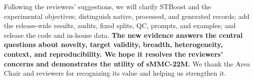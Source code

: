 \documentclass[10pt]{article}
\begin{document}
Following the reviewers' suggestions, we will clarify STBoost and the
experimental objectives; distinguish native, processed, and generated
records; add the release-wide results, audits, fixed splits, QC, prompts, and
examples; and release the code and in-house data. \textbf{The new evidence
answers the central questions about novelty, target validity, breadth,
heterogeneity, context, and reproducibility. We hope it resolves the reviewers'
concerns and demonstrates the utility of sMMC-22M.} We thank the Area Chair
and reviewers for recognizing its value and helping us strengthen it.
\end{document}
